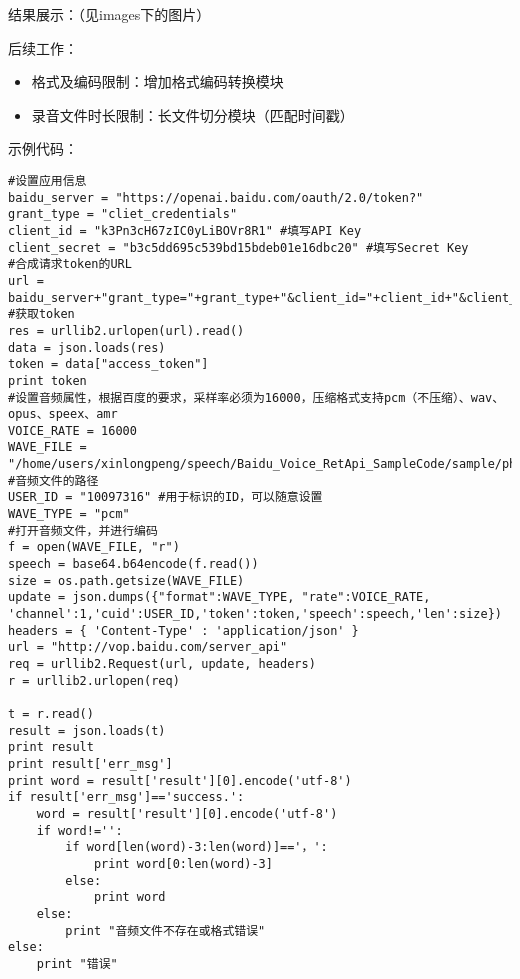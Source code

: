 \documentclass[10pt,a4paper]{ctexbook}
\begin{document}
结果展示：（见images下的图片）


后续工作：
\begin{itemize}
\item 格式及编码限制：增加格式编码转换模块
\item 录音文件时长限制：长文件切分模块（匹配时间戳）
\end{itemize}

示例代码：
\begin{verbatim}
#设置应用信息
baidu_server = "https://openai.baidu.com/oauth/2.0/token?"
grant_type = "cliet_credentials"
client_id = "k3Pn3cH67zIC0yLiBOVr8R1" #填写API Key
client_secret = "b3c5dd695c539bd15bdeb01e16dbc20" #填写Secret Key
#合成请求token的URL
url = baidu_server+"grant_type="+grant_type+"&client_id="+client_id+"&client_secret="+client_secret
#获取token
res = urllib2.urlopen(url).read()
data = json.loads(res)
token = data["access_token"]
print token
#设置音频属性，根据百度的要求，采样率必须为16000，压缩格式支持pcm（不压缩）、wav、opus、speex、amr
VOICE_RATE = 16000
WAVE_FILE = "/home/users/xinlongpeng/speech/Baidu_Voice_RetApi_SampleCode/sample/php/test.pcm" #音频文件的路径
USER_ID = "10097316" #用于标识的ID，可以随意设置
WAVE_TYPE = "pcm"
#打开音频文件，并进行编码
f = open(WAVE_FILE, "r")
speech = base64.b64encode(f.read())
size = os.path.getsize(WAVE_FILE)
update = json.dumps({"format":WAVE_TYPE, "rate":VOICE_RATE, 'channel':1,'cuid':USER_ID,'token':token,'speech':speech,'len':size})
headers = { 'Content-Type' : 'application/json' }
url = "http://vop.baidu.com/server_api"
req = urllib2.Request(url, update, headers)
r = urllib2.urlopen(req)
 
t = r.read()
result = json.loads(t)
print result
print result['err_msg']
print word = result['result'][0].encode('utf-8')
if result['err_msg']=='success.':
    word = result['result'][0].encode('utf-8')
    if word!='':
        if word[len(word)-3:len(word)]=='，':
            print word[0:len(word)-3]
        else:
            print word
    else:
        print "音频文件不存在或格式错误"
else:
    print "错误"
\end{verbatim}

\ifx\mlbook\undefined
    
\end{document}
